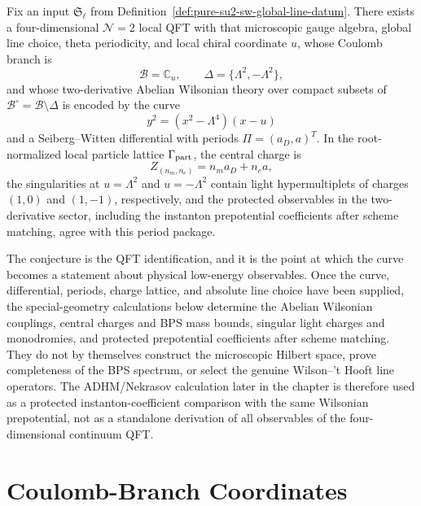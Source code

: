 \begin{conjecture}
\label{conj:pure-su2-sw-low-energy-solution}
Fix an input \(\mathfrak S_\ell\) from
Definition~\ref{def:pure-su2-sw-global-line-datum}.  There exists a
four-dimensional \(\mathcal N=2\) local QFT with that microscopic gauge algebra,
global line choice, theta periodicity, and local chiral coordinate \(u\), whose
Coulomb branch is
\[
  \mathcal B=\mathbb C_u,\qquad
  \Delta=\{\Lambda^2,-\Lambda^2\},
\]
and whose two-derivative Abelian Wilsonian theory over compact subsets of
\(\mathcal B^\circ=\mathcal B\setminus\Delta\) is encoded by the curve
\[
  y^2=(x^2-\Lambda^4)(x-u)
\]
and a Seiberg--Witten differential with periods
\(\Pi=(a_D,a)^T\).  In the root-normalized local particle lattice
\(\Gamma_{\rm part}\), the central charge is
\[
  Z_{(n_m,n_e)}=n_m a_D+n_e a,
\]
the singularities at \(u=\Lambda^2\) and \(u=-\Lambda^2\) contain light
hypermultiplets of charges \((1,0)\) and \((1,-1)\), respectively, and the
protected observables in the two-derivative sector, including the instanton
prepotential coefficients after scheme matching, agree with this period
package.
\end{conjecture}

The conjecture is the QFT identification, and it is the point at which the
curve becomes a statement about physical low-energy observables.  Once the
curve, differential, periods, charge lattice, and absolute line choice have
been supplied, the special-geometry calculations below determine the Abelian
Wilsonian couplings, central charges and BPS mass bounds, singular light
charges and monodromies, and protected prepotential coefficients after scheme
matching.  They do not by themselves construct the microscopic Hilbert space,
prove completeness of the BPS spectrum, or select the genuine Wilson--'t Hooft
line operators.  The ADHM/Nekrasov calculation later in the chapter is
therefore used as a protected instanton-coefficient comparison with the same
Wilsonian prepotential, not as a standalone derivation of all observables of
the four-dimensional continuum QFT.

\section{Coulomb-Branch Coordinates}

